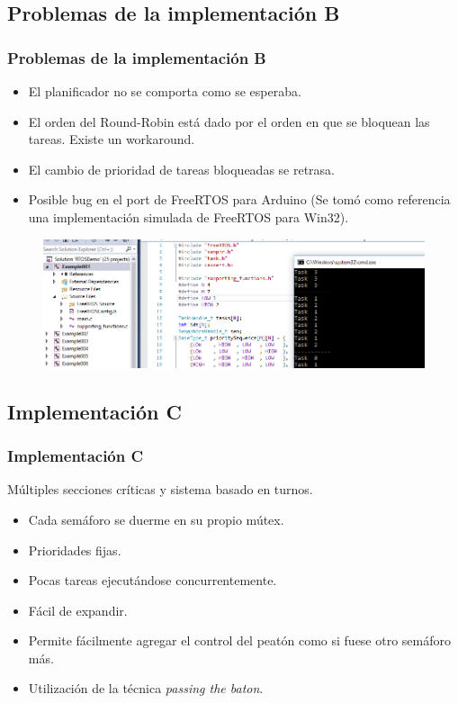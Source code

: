 \subsection{Problemas de la implementación B}
\begin{frame}
\frametitle{Problemas de la implementación B}
\begin{block}{}
	\begin{itemize}
		\item El planificador no se comporta como se esperaba.
		\item El orden del Round-Robin está dado por el orden en que se bloquean las tareas. Existe un workaround.
		\item El cambio de prioridad de tareas bloqueadas se retrasa.
		\item Posible bug en el port de FreeRTOS para Arduino (Se tomó como referencia una implementación simulada de FreeRTOS para Win32).
	\end{itemize}

\begin{figure}[htbp]
	\centering
	\includegraphics[width=0.8\hsize]{diagramas/screenshot-vs.png}
\end{figure}

\end{block}
\end{frame}

\subsection{Implementación C}
\begin{frame}
\frametitle{Implementación C}
\begin{block}{Múltiples secciones críticas y sistema basado en turnos.}
	\begin{itemize}
		\item Cada semáforo se duerme en su propio mútex.
		\item Prioridades fijas.
		\item Pocas tareas ejecutándose concurrentemente.
		\item Fácil de expandir.
		\item Permite fácilmente agregar el control del peatón como si fuese otro semáforo más.
		\item Utilización de la técnica \emph{passing the baton}.
	\end{itemize}
\end{block}
\end{frame}

